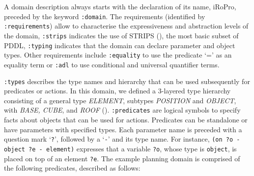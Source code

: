 A domain description always starts with the declaration of its name, \eg iRoPro, preceded by the keyword \texttt{:domain}.
The requirements (identified by \texttt{:requirements}) allow to characterise the expressiveness and abstraction levels of the domain, \eg
\texttt{:strips} indicates the use of STRIPS (\cite{fikes1971strips}), the most basic subset of PDDL,
\texttt{:typing} indicates that the domain can declare parameter and object types. %
Other requirements include \texttt{:equality} to use the predicate `=' as an equality term or \texttt{:adl} to use conditional and universal quantifier terms. 

\texttt{:types} describes the type names and hierarchy that can be used subsequently for predicates or actions.
In this domain, we defined a 3-layered type hierarchy consisting of a general type \textit{ELEMENT}, subtypes \textit{POSITION} and \textit{OBJECT}, with \textit{BASE, CUBE}, and \textit{ROOF} ().
\texttt{:predicates} are logical symbols to specify facts about objects that can be used for actions.
Predicates can be standalone or have parameters with specified types. 
Each parameter name is preceded with a question mark `\texttt{?}', followed by a `\texttt{-}' and its type name. 
For instance, \texttt{(on ?o - object ?e - element)} expresses that a variable \texttt{?o}, whose type is \texttt{object}, is placed on top of an element \texttt{?e}.
The example planning domain is comprised of the following predicates, described as follows:

